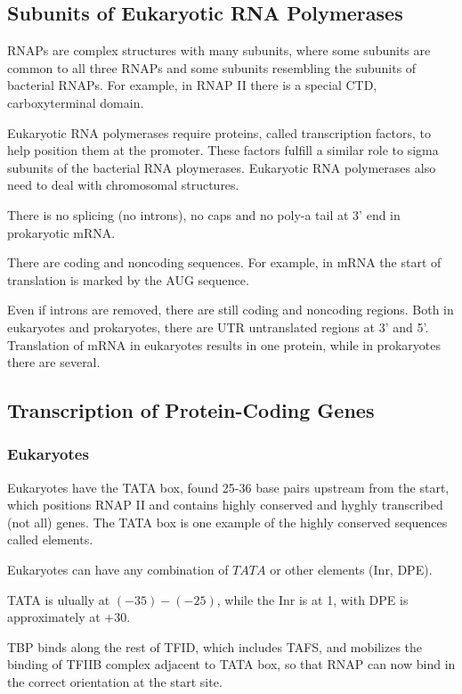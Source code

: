 \documentclass[11pt]{scrartcl}
\begin{document}
\subsection{Subunits of Eukaryotic RNA Polymerases}

RNAPs are complex structures with many subunits, where some subunits
are common to all three RNAPs and some subunits resembling the
subunits of bacterial RNAPs. For example, in RNAP II there is a
special CTD, carboxyterminal domain.

Eukaryotic RNA polymerases require proteins, called transcription
factors, to help position them at the promoter. These factors fulfill
a similar role to sigma subunits of the bacterial RNA
ploymerases. Eukaryotic RNA polymerases also need to deal with chromosomal
structures.

There is no splicing (no introns), no caps and no poly-a tail at 3'
end in prokaryotic mRNA.

There are coding and noncoding sequences. For example, in mRNA the
start of translation is marked by the AUG sequence.

Even if introns are removed, there are still coding and noncoding
regions. Both in eukaryotes and prokaryotes, there are UTR
untranslated regions at 3' and 5'. Translation of mRNA in eukaryotes
results in one protein, while in prokaryotes there are several.

\subsection{Transcription of Protein-Coding Genes}

\subsubsection{Eukaryotes}

Eukaryotes have the TATA box, found 25-36 base pairs upstream from the
start, which positions RNAP II and contains highly conserved and
hyghly transcribed (not all) genes. The TATA box is one example of the
highly conserved sequences called elements.

Eukaryotes can have any combination of $TATA$ or other elements (Inr,
DPE).

TATA is ulually at $(-35)-(-25)$, while the Inr is at 1, with DPE is
approximately at +30.

TBP binds along the rest of TFID, which includes TAFS, and mobilizes
the binding of TFIIB complex adjacent to TATA box, so that RNAP can
now bind in the correct orientation at the start site.
\end{document}
